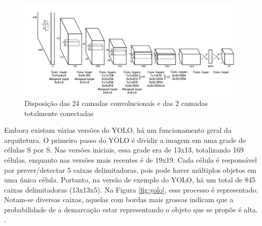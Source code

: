 \begin{figure}[!h]
    \center
    \begin{minipage}{1\linewidth}
    \center
    \captionsetup{justification=centering,margin=0.5cm,font=small}
    \includegraphics[width=1\linewidth]{img/cap2/RNC-YOLO.jpeg}
    \caption{ Disposição das 24 camadas convolucionais e das 2 camadas totalmente conectadas \cite{redmon2016youlookonce}} \label{fig:rnc-yolo}
    \end{minipage}
\end{figure}

Embora existam várias versões do YOLO, há um funcionamento geral da arquitetura. O primeiro passo do YOLO é dividir a imagem em uma grade de células S por S. Nas versões iniciais, essa grade era de 13x13, totalizando 169 células, enquanto nas versões mais recentes é de 19x19. Cada célula é responsável por prever/detectar 5 caixas delimitadoras, pois pode haver múltiplos objetos em uma única célula. Portanto, na versão de exemplo do YOLO, há um total de 845 caixas delimitadoras (13x13x5). Na Figura \ref{fig:yolo}, esse processo é representado. Notam-se diversas caixas, aquelas com bordas mais grossas indicam que a probabilidade de a demarcação estar representando o objeto que se propõe é alta. \cite{jiang2022review}.

